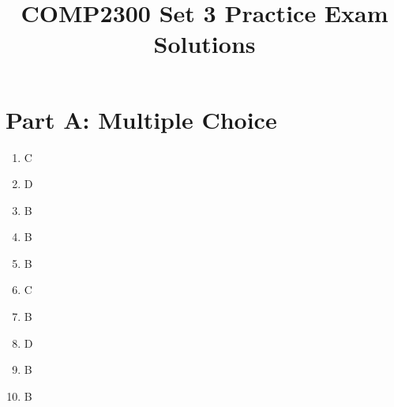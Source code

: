 \documentclass[11pt]{article}
\title{COMP2300 Set 3 Practice Exam Solutions}
\date{}
\begin{document}
\maketitle

\section*{Part A: Multiple Choice}
\begin{enumerate}[label=\textbf{A\arabic*.}]
  \item C
  \item D
  \item B
  \item B
  \item B
  \item C
  \item B
  \item D
  \item B
  \item B
\end{enumerate}
\end{document}
